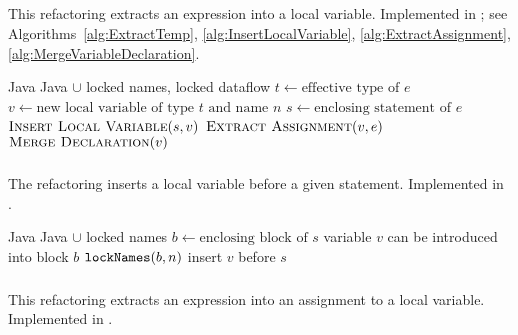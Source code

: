 \subsection{}
This refactoring extracts an expression into a local variable. Implemented in ; see Algorithms~\ref{alg:ExtractTemp}, \ref{alg:InsertLocalVariable}, \ref{alg:ExtractAssignment}, \ref{alg:MergeVariableDeclaration}.

\begin{algorithm}
\caption{$\refactoring{Extract Temp}(e : \type{Expr}, n : \type{Name})$}
\label{alg:ExtractTemp}
\begin{algorithmic}[1]
\REQUIRE Java
\ENSURE Java $\cup$ locked names, locked dataflow
\medskip
\STATE $t \leftarrow \text{effective type of $e$}$
\STATE $v \leftarrow \text{new local variable of type $t$ and name $n$}$
\STATE $s \leftarrow \text{enclosing statement of $e$}$
\STATE $\textsc{Insert Local Variable}(s, v)$
\STATE $\textsc{Extract Assignment}(v, e)$
\STATE $\textsc{Merge Declaration}(v)$
\end{algorithmic}
\end{algorithm}

\subsubsection{}
The refactoring inserts a local variable before a given statement. Implemented in .

\begin{algorithm}
\caption{$\refactoring{Insert Local Variable}(s : \type{Stmt}, v : \type{LocalVar}$)}
\label{alg:InsertLocalVariable}
\begin{algorithmic}[1]
\REQUIRE Java
\ENSURE Java $\cup$ locked names
\medskip
\STATE $b \leftarrow \text{enclosing block of $s$}$
\STATE \assert variable $v$ can be introduced into block $b$
\STATE $\text{\texttt{lockNames}}(b, n)$
\STATE insert $v$ before $s$
\end{algorithmic}
\end{algorithm}

\subsubsection{}
This refactoring extracts an expression into an assignment to a local variable. Implemented in .

